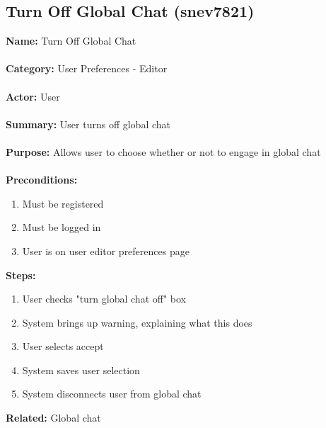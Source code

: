 \documentclass[11pt]{report}
\begin{document}
\subsection{Turn Off Global Chat (snev7821)}
\begin{framed}
	\noindent\textbf{Name:} Turn Off Global Chat \\ \\
	\textbf{Category:} User Preferences - Editor  \\ \\
	\textbf{Actor:} User \\ \\
	\textbf{Summary:} User turns off global chat \\ \\
	\textbf{Purpose:} Allows user to choose whether or not to engage in global chat \\ \\
	\textbf{Preconditions:} 
	\begin{enumerate}
		\item Must be registered
		\item Must be logged in
		\item User is on user editor preferences page
	\end{enumerate}
	\textbf{Steps:}
	\begin{enumerate}
		\item User checks "turn global chat off" box
		\item System brings up warning, explaining what this does
		\item User selects accept
		\item System saves user selection
		\item System disconnects user from global chat
	\end{enumerate}
	\textbf{Related:} Global chat
\end{framed}

\newpage
\end{document}
